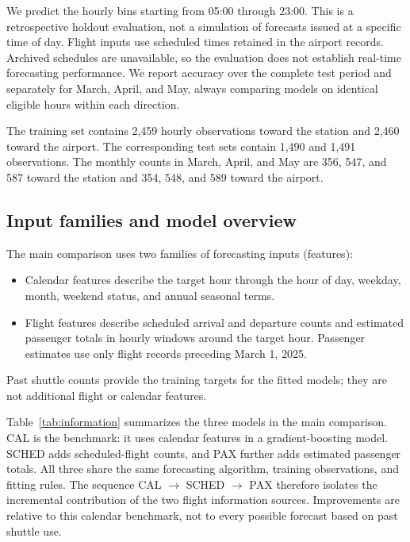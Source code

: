 \documentclass[preprint,12pt,times]{elsarticle}
\begin{document}
We predict the hourly bins starting from 05:00 through 23:00. This is a retrospective holdout evaluation, not a simulation of forecasts issued at a specific time of day. Flight inputs use scheduled times retained in the airport records. Archived schedules are unavailable, so the evaluation does not establish real-time forecasting performance. We report accuracy over the complete test period and separately for March, April, and May, always comparing models on identical eligible hours within each direction.

The training set contains 2,459 hourly observations toward the station and 2,460 toward the airport. The corresponding test sets contain 1,490 and 1,491 observations. The monthly counts in March, April, and May are 356, 547, and 587 toward the station and 354, 548, and 589 toward the airport.

\subsection{Input families and model overview}
The main comparison uses two families of forecasting inputs (features):
\begin{itemize}
\item Calendar features describe the target hour through the hour of day, weekday, month, weekend status, and annual seasonal terms.
\item Flight features describe scheduled arrival and departure counts and estimated passenger totals in hourly windows around the target hour. Passenger estimates use only flight records preceding March 1, 2025.
\end{itemize}
Past shuttle counts provide the training targets for the fitted models; they are not additional flight or calendar features.

Table~\ref{tab:information} summarizes the three models in the main comparison. CAL is the benchmark: it uses calendar features in a gradient-boosting model. SCHED adds scheduled-flight counts, and PAX further adds estimated passenger totals. All three share the same forecasting algorithm, training observations, and fitting rules. The sequence CAL $\rightarrow$ SCHED $\rightarrow$ PAX therefore isolates the incremental contribution of the two flight information sources. Improvements are relative to this calendar benchmark, not to every possible forecast based on past shuttle use.
\end{document}
